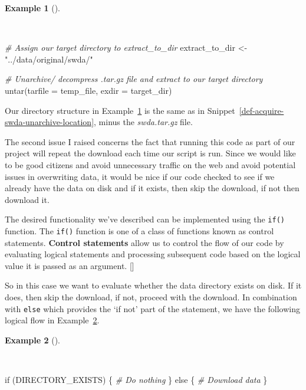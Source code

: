 \documentclass[
  letterpaper,
  krantz1]{latex/krantz-mod}
\newenvironment{Shaded}{\begin{snugshade}}{\end{snugshade}}
\newcommand{\AttributeTok}[1]{\textcolor[rgb]{0.00,0.00,0.00}{#1}}
\newcommand{\CommentTok}[1]{\textcolor[rgb]{0.00,0.00,0.00}{\textit{#1}}}
\newcommand{\ControlFlowTok}[1]{\textcolor[rgb]{0.00,0.00,0.00}{#1}}
\newcommand{\FunctionTok}[1]{\textcolor[rgb]{0.00,0.00,0.00}{#1}}
\newcommand{\NormalTok}[1]{\textcolor[rgb]{0.00,0.00,0.00}{#1}}
\newcommand{\OtherTok}[1]{\textcolor[rgb]{0.00,0.00,0.00}{#1}}
\newcommand{\StringTok}[1]{\textcolor[rgb]{0.00,0.00,0.00}{#1}}
\newcommand{\cindex}[1]{%
  \StrSubstitute{#1}{_}{\_}[\temp]%
  \index{\temp}%
}
\theoremstyle{definition}
\theoremstyle{definition}
\newtheorem{example}{Example}[chapter]
\theoremstyle{remark}
\begin{document}
\begin{example}[]\protect\hypertarget{exm-acquire-swda-untar-temp}{}\label{exm-acquire-swda-untar-temp}

~

\begin{Shaded}
\begin{Highlighting}[numbers=left,,]
\CommentTok{\# Assign our target directory to \textasciigrave{}extract\_to\_dir\textasciigrave{}}
\NormalTok{extract\_to\_dir }\OtherTok{\textless{}{-}} \StringTok{"../data/original/swda/"}

\CommentTok{\# Unarchive/ decompress .tar.gz file and extract to our target directory}
\FunctionTok{untar}\NormalTok{(}\AttributeTok{tarfile =}\NormalTok{ temp\_file, }\AttributeTok{exdir =}\NormalTok{ target\_dir)}
\end{Highlighting}
\end{Shaded}

\end{example}

Our directory structure in Example~\ref{exm-acquire-swda-untar-temp} is
the same as in Snippet~\ref{def-acquire-swda-unarchive-location}, minus
the \emph{swda.tar.gz} file.

The second issue I raised concerns the fact that running this code as
part of our project will repeat the download each time our script is
run. Since we would like to be good citizens and avoid unnecessary
traffic on the web and avoid potential issues in overwriting data, it
would be nice if our code checked to see if we already have the data on
disk and if it exists, then skip the download, if not then download it.

The desired functionality we've described can be implemented using the
\texttt{if()} function. The \texttt{if()} function is one of a class of
functions known as control statements. \textbf{Control
statements} allow us to control the flow of
our code by evaluating logical statements and processing subsequent code
based on the logical value it is passed as an argument.\cindex{if()}

So in this case we want to evaluate whether the data directory exists on
disk. If it does, then skip the download, if not, proceed with the
download. In combination with \texttt{else} which provides the `if not'
part of the statement, we have the following logical flow in
Example~\ref{exm-acquire-if-dir-exists}.

\begin{example}[]\protect\hypertarget{exm-acquire-if-dir-exists}{}\label{exm-acquire-if-dir-exists}

~

\begin{Shaded}
\begin{Highlighting}[numbers=left,,]
\ControlFlowTok{if}\NormalTok{ (DIRECTORY\_EXISTS) \{}
  \CommentTok{\# Do nothing}
\NormalTok{\} }\ControlFlowTok{else}\NormalTok{ \{}
  \CommentTok{\# Download data}
\NormalTok{\}}
\end{Highlighting}
\end{Shaded}

\end{example}
\end{document}
